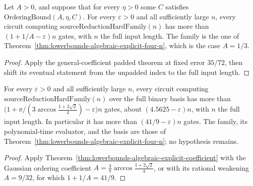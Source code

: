 \begin{theorem}
  \label{thm:lowerbounds-algebraic-explicit-coefficient}
  \leanok
  Let $A>0$, and suppose that for every $\eta>0$ some $C$ satisfies
  $\mathrm{OrderingBound}(A,\eta,C)$. For every $\varepsilon>0$ and all
  sufficiently large $n$, every circuit computing
  $\mathrm{sourceReductionHardFamily}(n)$ has more than
  $(1+1/A-\varepsilon)n$ gates, with $n$ the full input length. The family
  is the one of Theorem~\ref{thm:lowerbounds-algebraic-explicit-four-n},
  which is the case $A=1/3$.
\end{theorem}
\begin{proof}
  \leanok
  Apply the general-coefficient padded theorem at fixed error $35/72$,
  then shift its eventual statement from the unpadded index to the full
  input length.
\end{proof}

\begin{theorem}
  \label{thm:lowerbounds-algebraic-explicit-gaussian}
  \leanok
  For every $\varepsilon>0$ and all sufficiently large $n$, every circuit
  computing $\mathrm{sourceReductionHardFamily}(n)$ over the full binary
  basis has more than $\bigl(1+\pi/(3\arccos\tfrac{1+2\sqrt2}{4})-\varepsilon\bigr)n$
  gates, about $(4.5625-\varepsilon)n$, with $n$ the full input length. In
  particular it has more than $(41/9-\varepsilon)n$ gates. The family, its
  polynomial-time evaluator, and the basis are those of
  Theorem~\ref{thm:lowerbounds-algebraic-explicit-four-n}; no hypothesis
  remains.
\end{theorem}
\begin{proof}
  \leanok
  Apply Theorem~\ref{thm:lowerbounds-algebraic-explicit-coefficient} with
  the Gaussian ordering coefficient
  $A=\tfrac{3}{\pi}\arccos\tfrac{1+2\sqrt2}{4}$, or with its rational weakening
  $A=9/32$, for which $1+1/A=41/9$.
\end{proof}

